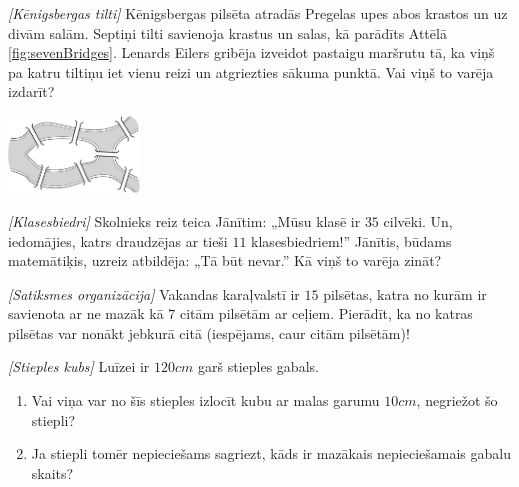 






\noindent 

\begin{problem}
\textit{[Kēnigsbergas tilti]}
Kēnigsbergas pilsēta atradās Pregelas upes abos krastos un uz divām salām. Septiņi tilti savienoja krastus un salas, kā parādīts Attēlā \ref{fig:sevenBridges}. Lenards Eilers gribēja izveidot pastaigu maršrutu tā, ka viņš pa katru tiltiņu iet vienu reizi un atgriezties sākuma punktā. Vai viņš to varēja izdarīt?

\begin{center}
\includegraphics[width=3.5cm]{euler2.png}
\label{fig:sevenBridges}
\end{center} 
\end{problem}
%

\begin{problem}
\textit{[Klasesbiedri]}
Skolnieks reiz teica Jānītim: „Mūsu klasē ir $35$ cilvēki. Un, iedomājies, katrs draudzējas  ar tieši $11$ klasesbiedriem!”
Jānītis, būdams matemātiķis, uzreiz atbildēja: „Tā būt nevar.” 
Kā viņš to varēja zināt?
\end{problem}
%

\begin{problem}
\textit{[Satiksmes organizācija]}
Vakandas karaļvalstī ir $15$ pilsētas, katra no kurām ir savienota ar ne mazāk kā $7$ citām pilsētām ar ceļiem. Pierādīt, ka no katras pilsētas var nonākt jebkurā citā (iespējams, caur citām pilsētām)!
\end{problem}
%

\begin{problem}
\textit{[Stieples kubs]}
Luīzei ir $120cm$ garš stieples gabals.
\begin{enumerate}
\item Vai viņa var no šīs stieples izlocīt kubu ar malas garumu $10cm$, negriežot šo stiepli?
\item Ja stiepli tomēr nepieciešams sagriezt, kāds ir mazākais nepieciešamais gabalu skaits?
\end{enumerate}
\end{problem}
%

